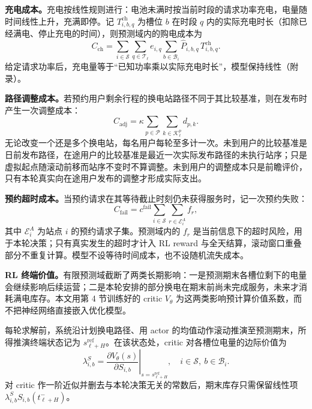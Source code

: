 \documentclass[12pt,a4paper,UTF8]{ctexart}
\begin{document}
\textbf{充电成本。}充电按线性规则进行：电池未满时按当前时段的请求功率充电，电量随时间线性上升，充满即停。记 $T_{i,b,q}^{\mathrm{ch}}$ 为槽位 $b$ 在时段 $q$ 内的实际充电时长（扣除已经满电、停止充电的时间），则预测域内的购电成本为
\begin{equation}
C_{\mathrm{ch}}
=
\sum_{i\in\mathcal S}
\sum_{q\in\mathcal T_\ell}
e_{i,q}
\sum_{b\in\mathcal B_i}
\widehat P_{i,b,q}\,T_{i,b,q}^{\mathrm{ch}}.
\label{eq:chargingcost}
\end{equation}
给定请求功率后，充电量等于“已知功率乘以实际充电时长”，模型保持线性（附录）。

\textbf{路径调整成本。}若预约用户剩余行程的换电站路径不同于其比较基准，则在发布时产生一次调整成本：
\begin{equation}
C_{\mathrm{adj}}
=
\kappa
\sum_{p\in\mathcal P}
\sum_{k\in\mathcal K_\ell^p}
d_{p,k}.
\label{eq:adjustment_cost}
\end{equation}
无论改变一个还是多个换电站，每名用户每轮至多计一次。未到用户的比较基准是日前发布路径，在途用户的比较基准是最近一次实际发布路径的未执行站序；只是虚拟起点随滚动前移而站序不变时不算调整。未到用户的调整成本只是前瞻评价，只有本轮真实向在途用户发布的调整才形成实际支出。

\textbf{预约超时成本。}当预约请求在其等待截止时刻仍未获得服务时，记一次预约失败：
\begin{equation}
C_{\mathrm{fail}}
=
c^{\mathrm{fail}}
\sum_{i\in\mathcal S}
\sum_{r\in\mathcal E_{i}^{A}}
f_r,
\label{eq:reservation_failure_cost}
\end{equation}
其中 $\mathcal E_i^A$ 为站点 $i$ 的预约请求子集。预测域内的 $f_r$ 是当前信息下的超时风险，用于本轮决策；只有真实发生的超时才计入 RL reward 与全天结算，滚动窗口重叠部分不重复计算。模型不设等待时间成本，也不设随机流失成本。

\textbf{RL 终端价值。}有限预测域截断了两类长期影响：一是预测期末各槽位剩下的电量会继续影响后续运营；二是本轮安排的部分换电在期末前尚未完成服务，未来才消耗满电库存。本文用第 4 节训练好的 critic $V_\theta$ 为这两类影响预计算价值系数，而不把神经网络直接嵌入优化模型。

每轮求解前，系统沿计划换电路径、用 actor 的均值动作滚动推演至预测期末，所得推演终端状态记为 $s_{\ell+H}^{\mathrm{ref}}$。在该状态处，critic 对各槽位电量的边际价值为
\begin{equation}
\lambda^S_{i,b}
=
\left.
\frac{\partial V_{\theta}(s)}
{\partial S_{i,b}}
\right|_{s=s_{\ell+H}^{\mathrm{ref}}},
\quad i\in\mathcal S,\ b\in\mathcal B_i.
\label{eq:marginal_value_soc}
\end{equation}
对 critic 作一阶近似并删去与本轮决策无关的常数后，期末库存只需保留线性项 $\lambda^S_{i,b}S_{i,b}(t_{\ell+H}^{-})$。
\end{document}
